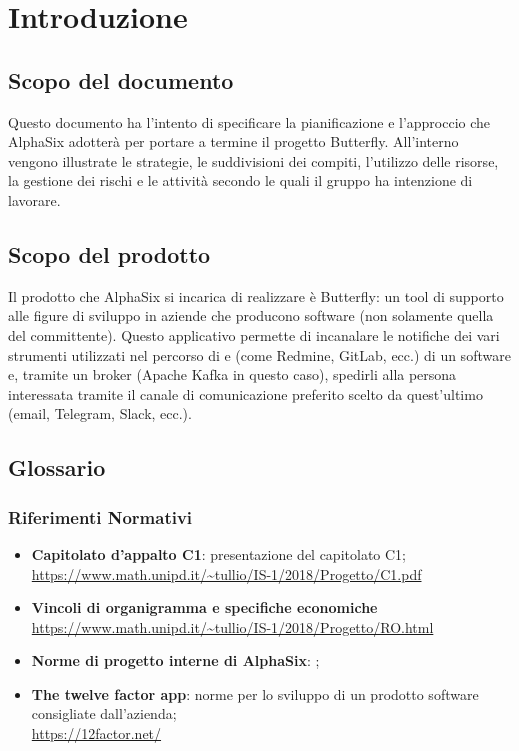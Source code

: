 \newpage
\section{Introduzione} \label{Introduzione}
	
	\subsection{Scopo del documento}
	Questo documento ha l'intento di specificare la pianificazione e l'approccio che AlphaSix adotterà per portare a termine il progetto Butterfly.
	All'interno vengono illustrate le strategie, le suddivisioni dei compiti, l'utilizzo delle risorse, la gestione dei rischi e le attività secondo le quali il gruppo ha intenzione di lavorare.
	
	\subsection{Scopo del prodotto}	
	Il prodotto che AlphaSix si incarica di realizzare è Butterfly: un tool di supporto alle figure di sviluppo in aziende che producono software (non solamente quella del committente).
	Questo applicativo permette di incanalare le notifiche dei vari strumenti utilizzati nel percorso di  e  (come Redmine, GitLab, ecc.) di un software e, tramite un broker (Apache Kafka in questo caso), spedirli alla persona interessata tramite il canale di comunicazione
	preferito scelto da quest'ultimo (email, Telegram, Slack, ecc.).
	
	\subsection{Glossario}
		\subsubsection{Riferimenti Normativi}
			\begin{itemize}
				\item \textbf{Capitolato d'appalto C1}: presentazione del capitolato C1;\\
				\url{https://www.math.unipd.it/~tullio/IS-1/2018/Progetto/C1.pdf}
				\item \textbf{Vincoli di organigramma e specifiche economiche}\\
				\url{https://www.math.unipd.it/~tullio/IS-1/2018/Progetto/RO.html}
				\item \textbf{Norme di progetto interne di AlphaSix}: \NdPv;
				\item \textbf{The twelve factor app}: norme per lo sviluppo di un prodotto software consigliate dall'azienda;\\
				\url{https://12factor.net/}
			\end{itemize}
		
